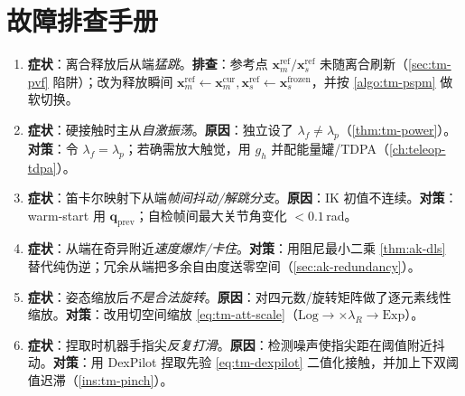 \section*{故障排查手册}
\begin{enumerate}
  \item \textbf{症状}：离合释放后从端\emph{猛跳}。\textbf{排查}：参考点 $\mathbf{x}_m^{\text{ref}}/\mathbf{x}_s^{\text{ref}}$ 未随离合刷新（\cref{sec:tm-pvf} 陷阱）；改为释放瞬间 $\mathbf{x}_m^{\text{ref}}\!\leftarrow\!\mathbf{x}_m^{\text{cur}},\mathbf{x}_s^{\text{ref}}\!\leftarrow\!\mathbf{x}_s^{\text{frozen}}$，并按 \cref{algo:tm-pspm} 做软切换。
  \item \textbf{症状}：硬接触时主从\emph{自激振荡}。\textbf{原因}：独立设了 $\lambda_f\neq\lambda_p$（\cref{thm:tm-power}）。\textbf{对策}：令 $\lambda_f=\lambda_p$；若确需放大触觉，用 $g_h$ 并配能量罐/TDPA（\cref{ch:teleop-tdpa}）。
  \item \textbf{症状}：笛卡尔映射下从端\emph{帧间抖动/解跳分支}。\textbf{原因}：IK 初值不连续。\textbf{对策}：warm-start 用 $\mathbf{q}_{\text{prev}}$；自检帧间最大关节角变化 $<0.1\,$rad。
  \item \textbf{症状}：从端在奇异附近\emph{速度爆炸/卡住}。\textbf{对策}：用阻尼最小二乘 \cref{thm:ak-dls} 替代纯伪逆；冗余从端把多余自由度送零空间（\cref{sec:ak-redundancy}）。
  \item \textbf{症状}：姿态缩放后\emph{不是合法旋转}。\textbf{原因}：对四元数/旋转矩阵做了逐元素线性缩放。\textbf{对策}：改用切空间缩放 \cref{eq:tm-att-scale}（$\mathrm{Log}\to\times\lambda_R\to\mathrm{Exp}$）。
  \item \textbf{症状}：捏取时机器手指尖\emph{反复打滑}。\textbf{原因}：检测噪声使指尖距在阈值附近抖动。\textbf{对策}：用 DexPilot 捏取先验 \cref{eq:tm-dexpilot} 二值化接触，并加上下双阈值迟滞（\cref{ins:tm-pinch}）。
\end{enumerate}

